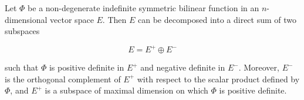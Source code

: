 Let $\Phi$ be a non-degenerate indefinite symmetric bilinear function in an $n$-dimensional vector space $E$. Then $E$ can be decomposed into a direct sum of two subspaces

$$E = E^+ \oplus E^-$$

such that $\Phi$ is positive definite in $E^+$ and negative definite in $E^-$. Moreover, $E^-$ is the orthogonal complement of $E^+$ with respect to the scalar product defined by $\Phi$, and $E^+$ is a subspace of maximal dimension on which $\Phi$ is positive definite.

